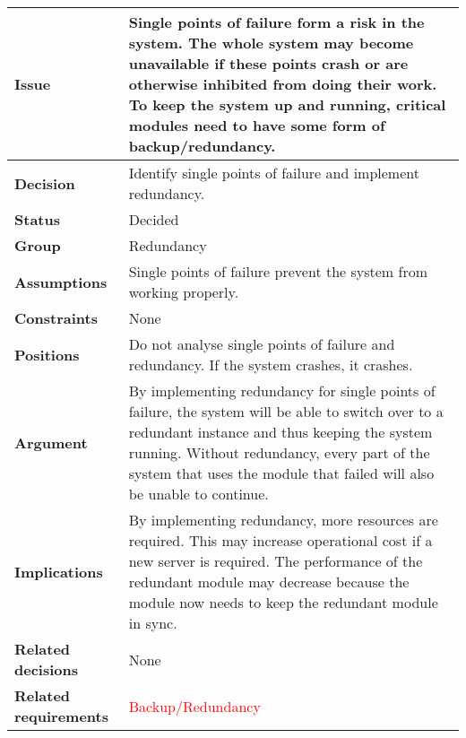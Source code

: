 
\begin{tabular}{ l  p{10cm}}
\hline
\bf Issue & Single points of failure form a risk in the system. The whole system may become unavailable if these points crash or are otherwise inhibited from doing their work. To keep the system up and running, critical modules need to have some form of backup/redundancy. \\
\hline
\bf Decision & Identify single points of failure and implement redundancy. \\
\hline
\bf Status & Decided \\
\hline
\bf Group & Redundancy \\
\hline
\bf Assumptions & Single points of failure prevent the system from working properly. \\
\hline
\bf Constraints & None \\
\hline
\bf Positions & Do not analyse single points of failure and redundancy. If the system crashes, it crashes. \\
\hline
\bf Argument & By implementing redundancy for single points of failure, the system will be able to switch over to a redundant instance and thus keeping the system running. Without redundancy, every part of the system that uses the module that failed will also be unable to continue. \\
\hline
\bf Implications & By implementing redundancy, more resources are required. This may increase operational cost if a new server is required. The performance of the redundant module may decrease because the module now needs to keep the redundant module in sync. \\
\hline
\bf Related decisions & None \\
\hline
\bf Related requirements & \textcolor{red}{Backup/Redundancy} \\
\hline
\end{tabular}
